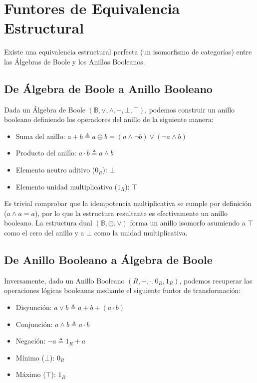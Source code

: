 \section{Funtores de Equivalencia Estructural}

Existe una equivalencia estructural perfecta (un isomorfismo de categorías) entre las Álgebras de Boole y los Anillos Booleanos.

\subsection{De Álgebra de Boole a Anillo Booleano}
Dada un Álgebra de Boole $(\mathbb{B}, \vee, \wedge, \neg, \bot, \top)$, podemos construir un anillo booleano definiendo los operadores del anillo de la siguiente manera:
\begin{itemize}
    \item Suma del anillo: $a + b \triangleq a \oplus b = (a \wedge \neg b) \vee (\neg a \wedge b)$
    \item Producto del anillo: $a \cdot b \triangleq a \wedge b$
    \item Elemento neutro aditivo ($0_R$): $\bot$
    \item Elemento unidad multiplicativo ($1_R$): $\top$
\end{itemize}
Es trivial comprobar que la idempotencia multiplicativa se cumple por definición ($a \wedge a = a$), por lo que la estructura resultante es efectivamente un anillo booleano. La estructura dual $(\mathbb{B}, \odot, \vee)$ forma un anillo isomorfo asumiendo a $\top$ como el cero del anillo y a $\bot$ como la unidad multiplicativa.

\subsection{De Anillo Booleano a Álgebra de Boole}
Inversamente, dado un Anillo Booleano $(R, +, \cdot, 0_R, 1_R)$, podemos recuperar las operaciones lógicas booleanas mediante el siguiente funtor de transformación:
\begin{itemize}
    \item Disyunción: $a \vee b \triangleq a + b + (a \cdot b)$
    \item Conjunción: $a \wedge b \triangleq a \cdot b$
    \item Negación: $\neg a \triangleq 1_R + a$
    \item Mínimo ($\bot$): $0_R$
    \item Máximo ($\top$): $1_R$
\end{itemize}

